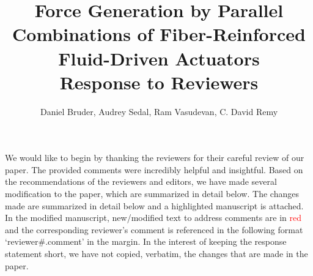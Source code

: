 \documentclass[dvipsnames ]{article}
\providecommand{\red}[1]{\textcolor{red}{#1}}
\begin{document}
\title{
Force Generation by Parallel Combinations of Fiber-Reinforced Fluid-Driven Actuators \\
{\bf Response to Reviewers}}
\author{Daniel Bruder, Audrey Sedal, Ram Vasudevan, C. David Remy}
\maketitle

We would like to begin by thanking the reviewers for their careful review of our paper.
The provided comments were incredibly helpful and insightful.
Based on the recommendations of the reviewers and editors, we have made several modification to the paper, which are summarized in detail below. 
The changes made are summarized in detail below and a highlighted manuscript is attached.
In the modified manuscript, new/modified text to address comments are in \red{red} and the corresponding reviewer's comment is referenced in the following format `reviewer\#.comment' in the margin.
In the interest of keeping the response statement short, we have not copied, verbatim, the changes that are made in the paper.




\end{document}
